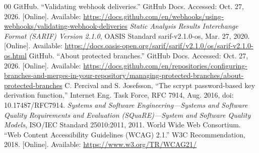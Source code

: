 \documentclass[conference]{IEEEtran}
\begin{document}
\begin{thebibliography}{00}
 GitHub. ``Validating webhook deliveries.'' GitHub Docs. Accessed: Oct. 27, 2026. [Online]. Available: \url{https://docs.github.com/en/webhooks/using-webhooks/validating-webhook-deliveries}
 \textit{Static Analysis Results Interchange Format (SARIF) Version 2.1.0}, OASIS Standard sarif-v2.1.0-os, Mar. 27, 2020. [Online]. Available: \url{https://docs.oasis-open.org/sarif/sarif/v2.1.0/os/sarif-v2.1.0-os.html}
 GitHub. ``About protected branches.'' GitHub Docs. Accessed: Oct. 27, 2026. [Online]. Available: \url{https://docs.github.com/en/repositories/configuring-branches-and-merges-in-your-repository/managing-protected-branches/about-protected-branches}
 C. Percival and S. Josefsson, ``The scrypt password-based key derivation function,'' Internet Eng. Task Force, RFC 7914, Aug. 2016, doi: 10.17487/RFC7914.
 \textit{Systems and Software Engineering---Systems and Software Quality Requirements and Evaluation (SQuaRE)---System and Software Quality Models}, ISO/IEC Standard 25010:2011, 2011.
 World Wide Web Consortium. ``Web Content Accessibility Guidelines (WCAG) 2.1.'' W3C Recommendation, 2018. [Online]. Available: \url{https://www.w3.org/TR/WCAG21/}
\end{thebibliography}
\end{document}
